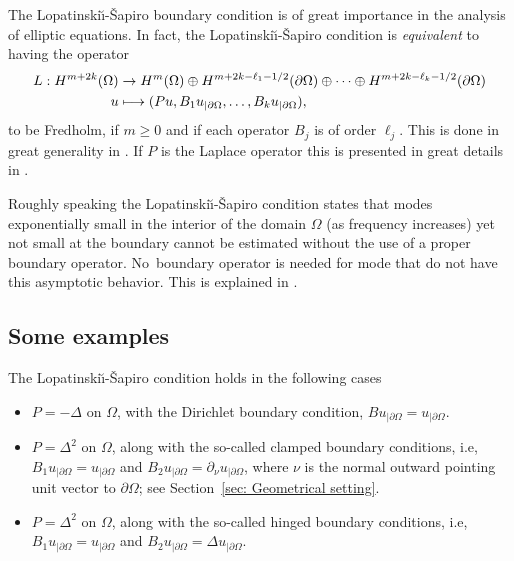 \documentclass[JEP,XML,SOM,Unicode,published]{cedram}
\newcommand\mto{\mathchoice{\longmapsto}{\mapsto}{\mapsto}{\mapsto}}
\theoremstyle{plain}
\theoremstyle{definition}
\newcommand{\LS}{Lopatinski\u{\i}-\v{S}apiro\xspace}
\begin{document}
The \LS boundary condition is of great importance in the analysis of
elliptic equations. In fact, the \LS condition is
\emph{equivalent} to having the operator
\begin{align*}
L: H^{m+2k}(\Omega) &\to H^{m}(\Omega)
\oplus H^{m+2k-\ell_1-1/2}(\partial \Omega)
\oplus \cdots \oplus
H^{m+2k-\ell_k-1/2}(\partial \Omega) \\
u & \mto (P u, B_1 u_{|\partial \Omega}, \dots, B_k u_{|\partial \Omega}),\notag
\end{align*}
to be Fredholm, if $m\geq 0$ and if each operator $B_j$ is of order
$\ell_j$. This is done in great generality in \cite[Chap.\,20]{Hoermander:V3}. If $P$ is the Laplace operator this is presented
in great details in \cite[Chap.\,3]{JGL-vol2}.

Roughly speaking the \LS condition states that modes exponentially
small in the interior of the domain $\Omega$ (as frequency increases)
yet not small at the boundary cannot be estimated without the use of a proper
boundary operator.
No~boundary operator is needed for mode that do not have this asymptotic behavior.
This is explained in \cite[\S 2.1.1]{JGL-vol2}.

\subsection{Some examples}

The \LS condition holds in the following cases
\begin{itemize}
\item $P=-\Delta$ on $\Omega$, with the Dirichlet boundary condition, $Bu_{|\partial\Omega}=u_{|\partial\Omega}$.
\item $P=\Delta^2$ on $\Omega$, along with the so-called clamped
boundary conditions, i.e,
$B_1u_{|\partial\Omega}=u_{|\partial\Omega}$ and
$B_2u_{|\partial\Omega}=\partial_{\nu}u_{|\partial\Omega}$, where
$\nu$ is the normal outward pointing unit vector to
$\partial\Omega$; see Section~\ref{sec: Geometrical setting}.
\item $P=\Delta^2$ on $\Omega$, along with the so-called hinged boundary conditions, i.e, $B_1u_{|\partial\Omega}=u_{|\partial\Omega}$ and $B_2u_{|\partial\Omega}=\Delta u_{|\partial\Omega}$.
\end{itemize}
\end{document}

